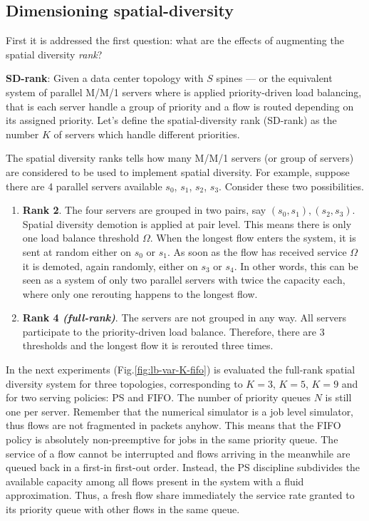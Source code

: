 \subsection{Dimensioning spatial-diversity}
\label{sec:dimensioning-spatial}
First it is addressed the first question: what are the effects of augmenting the spatial diversity \emph{rank}? 
\begin{tcolorbox}
	\textbf{SD-rank}: Given a data center topology with $S$ spines --- or the equivalent system of parallel M/M/1 servers where is applied priority-driven load balancing, that is each server handle a group of priority and a flow is routed depending on its assigned priority. Let's define the spatial-diversity rank (SD-rank) as the number $K$ of servers which handle different priorities. 
\end{tcolorbox}
The spatial diversity ranks tells how many M/M/1 servers (or group of servers) are considered to be used to implement spatial diversity. For example, suppose there are 4 parallel servers available $s_0$, $s_1$, $s_2$, $s_3$. Consider these two possibilities. 
\begin{enumerate}
	\item \textbf{Rank 2}. The four servers are grouped in two pairs, say $(s_0, s_1), (s_2,s_3)$. Spatial diversity demotion is applied at pair level. This means there is only one load balance threshold $\Omega$. When the longest flow enters the system, it is sent at random either on $s_0$ or $s_1$. As soon as the flow has received service $\Omega$ it is demoted, again randomly, either on $s_3$ or $s_4$. In other words, this can be seen as a system of only two parallel servers with twice the capacity each, where only one rerouting happens to the longest flow. 
	\item \textbf{Rank 4 \textit{(full-rank)}}. The servers are not grouped in any way. All servers participate to the priority-driven load balance. Therefore, there are 3 thresholds and the longest flow it is rerouted three times.
\end{enumerate}
In the next experiments (Fig.\ref{fig:lb-var-K-fifo}) is evaluated the full-rank spatial diversity system for three topologies, corresponding to $K=3$, $K=5$, $K=9$ and for two serving policies: PS and FIFO. The number of priority queues $N$ is still one per server. Remember that the numerical simulator is a job level simulator, thus flows are not fragmented in packets anyhow. This means that the FIFO policy is absolutely non-preemptive for jobs in the same priority queue. The service of a flow cannot be interrupted and flows arriving in the meanwhile are queued back in a first-in first-out order. Instead, the PS discipline subdivides the available capacity among all flows present in the system with a fluid approximation. Thus, a fresh flow share immediately the service rate granted to its priority queue with other flows in the same queue. 
